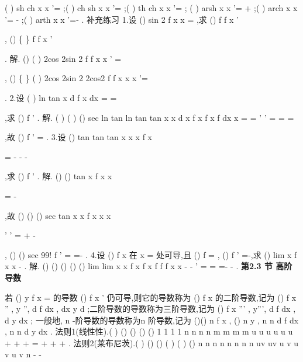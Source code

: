 (
)
sh
ch
x
x
'=
;(
)
ch
sh
x
x
'=
;(
)
th
ch
x
x
'=
; 
(
)
arsh
x
x
'=
+
;(
)
arch
x
x
'=
-
;(
)
arth
x
x
'=-
. 
\textcolor{lyred}{补充练习 }
1.设
()
sin 2
f x
x
=
,求
()
f
f x
'


,
()
\{
\}
f
f x
'




. 
解.
()
(
)
2cos 2sin 2
f
f x
x
'
=




,
()
\{
\}
(
)
2cos 2sin 2
2cos2
f
f x
x
x
'=
\cdots 




. 
2.设
(
)
ln tan
x
d
f
x
dx
\pi 
=
=




,求
()
f '
. 
解.
(
)
(
)
()
sec
ln tan
ln tan
tan
x
x
d
x
f
x
f
x
f
dx
x
\pi 
\pi 
=
=
'
'
=
\cdots 
=
=




,故
()
f '
=
. 
3.设
()
tan
tan
tan
x
x
x
f x
\pi 
\pi 
\pi 






=
-
-
-











\Lambda 
,求
()
f '
. 
解.
()
()
tan
x
f x
x
\pi 
\varphi 


=
-




,故
()
()
()
sec
tan
x
x
f
x
x
x
\pi 
\pi 
\pi 
\varphi 
\varphi 


'
'
=
\cdots 
+
-




, 
()
()
sec
99!
f
\pi 
\pi 
\pi 
\varphi 
'
=
\cdots 
=-
\cdots 
. 
4.设
()
f x 在
x =
处可导,且
()
f
=
,
()
f '
=-,求
()
lim
x
f
x
x
\to 
-
. 
解.
()
()
()
()
()
lim
lim
x
x
f
x
f
x
f
f
f
x
x
\to 
\to 
-
-
'
=
=
=-
-
. 
\vspace{6pt}
{\large \bfseries \textcolor{lyred}{第2.3 节 高阶导数}}

若
()
y
f x
=
的导数
()
f
x
'
仍可导,则它的导数称为
()
f x 的\textcolor{lyred}{二阶导数},记为
()
f
x
''
, 
y '',
d f
dx
,
dx
y
d
;二阶导数的导数称为\textcolor{lyred}{三阶导数},记为
()
f
x
'''
, y''',
d f
dx ,
d y
dx ; 
一般地,
n -阶导数的导数称为\textcolor{lyred}{n 阶导数},记为
()()
n
f
x ,
()
n
y
,
n
n
d f
dx
,
n
n
d y
dx . 
\textcolor{lyred}{法则1(线性性)}.(
)
()
()
()
()
1 1
1 1
n
n
n
n
m
m
m
m
u
u
u
u
u
u
\alpha 
\alpha 
\alpha 
\alpha 
\alpha 
\alpha 
+
+
+
=
+
+
+
\Lambda 
\Lambda 
. 
\textcolor{lyred}{法则2(莱布尼茨)}.(
)
()
()
(
)
(
)
()
n
n
n
n
n
n
n
n
uv
uv
u v
u v
u
v
n
-
-




